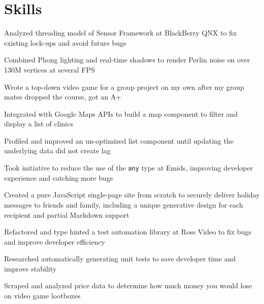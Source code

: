 \section{Skills}

\begin{bullets}
	\item Analyzed threading model of Sensor Framework at BlackBerry QNX to fix existing lock-ups and avoid future bugs
	\item Combined Phong lighting and real-time shadows to render Perlin noise on over 130M vertices at several FPS
    \item Wrote a top-down video game for a group project on my own after my group mates dropped the course, got an A+
\end{bullets}

\begin{bullets}
    \item Integrated with Google Maps APIs to build a map component to filter and display a list of clinics
    \item Profiled and improved an un-optimized list component until updating the underlying data did not create lag
    \item Took initiative to reduce the use of the \texttt{any} type at Emids, improving developer experience and catching more bugs
    \item Created a pure JavaScript single-page site from scratch to securely deliver holiday messages to friends and family, including a unique generative design for each recipient and partial Markdown support
\end{bullets}

\newpage

\begin{bullets}
    \item Refactored and type hinted a test automation library at Ross Video to fix bugs and improve developer efficiency
    \item Researched automatically generating unit tests to save developer time and improve stability
    \item Scraped and analyzed price data to determine how much money you would lose on video game lootboxes
\end{bullets}


